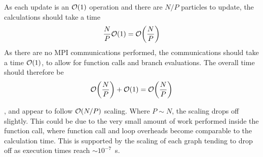 %
As each update is an $\mathcal{O}{\left({ 1 }\right)}$ operation and there are $N/P$ particles
to update,
the calculations should take a time
\begin{equation}
    \frac{N}{P}\mathcal{O}{\left({ 1 }\right)} = \mathcal{O}{\left({ \frac{N}{P} }\right)}
\end  {equation}
%
As there are no MPI communications performed, the communications should
take a time $\mathcal{O}{\left({ 1 }\right)}$, to allow for function calls and branch evaluations.
%
The overall time should therefore be
\begin{equation}
    \mathcal{O}{\left({ \frac{N}{P} }\right)} + \mathcal{O}{\left({ 1 }\right)} = \mathcal{O}{\left({ \frac{N}{P} }\right)}
\end{equation}


%
%
\begin{figure}[!h]
    
    \caption{}
    \label{fig:v0_systolic_individual_operation_512_logtime}
\end  {figure}

\begin{figure}[!h]
    
    \caption{}
    \label{fig:v0_systolic_individual_operation_4096_logtime}
\end  {figure}

\begin{figure}[!h]
    
    \caption{}
    \label{fig:v0_systolic_individual_operation_32768_logtime}
\end  {figure}

\vZeroTimeExplanation
    {}
    {}
    {}
    {\individualoperation{}}
    {\systolicloop{}}


%
,
 and
appear to follow $\mathcal{O}{\left({ N/P }\right)}$ scaling.
%
Where $P \sim{} N$, the scaling drops off slightly.
%
This could be due to the very small amount of work performed
inside the function call, where function call and loop overheads
become comparable to the calculation time.
%
This is supported by the scaling of each graph tending to drop off
as execution times reach $\sim{} 10^{-7}$~s.

